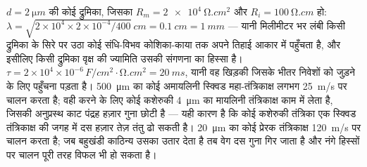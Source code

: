 \begin{example}[किसी द्रुमिका और दो तंत्रिकाक्षों के आँकड़े]\label{ex:b3:nervous-systems:numbers}
$d = \qty{2}{\micro m}$ की कोई द्रुमिका, जिसका $R_{m} = \qty{2e4}{\ohm.cm^2}$
और $R_{i} = \qty{100}{\ohm.cm}$ हो: $\lambda = \sqrt{2\times 10^{4}\times
2\times 10^{-4}/400}\ \unit{cm} = \qty{0.1}{cm} = \qty{1}{mm}$ --- यानी
मिलीमीटर भर लंबी किसी द्रुमिका के सिरे पर उठा कोई संधि-विभव कोशिका-काया
तक अपने तिहाई आकार में पहुँचता है, और इसीलिए किसी द्रुमिका वृक्ष की
ज्यामिति उसकी संगणना का हिस्सा है। $\tau = 2\times 10^{4}\times
10^{-6}\,\unit{F/cm^2}\cdot\unit{\ohm.cm^2} = \qty{20}{ms}$, यानी वह
खिड़की जिसके भीतर निवेशों को जुड़ने के लिए पहुँचना पड़ता है।
\qty{500}{\micro m} का कोई अमायलिनी स्क्विड महा-तंत्रिकाक्ष लगभग
\qty{25}{m/s} पर चालन करता है; वही करने के लिए कोई कशेरुकी
\qty{4}{\micro m} का मायलिनी तंत्रिकाक्ष काम में लेता है, जिसकी
अनुप्रस्थ काट पंद्रह हज़ार गुना छोटी है --- यही कारण है कि कोई कशेरुकी
तंत्रिका एक स्क्विड तंत्रिकाक्ष की जगह में दस हज़ार तेज़ तंतु ढो सकती
है। \qty{20}{\micro m} का कोई प्रेरक तंत्रिकाक्ष \qty{120}{m/s} पर
चालन करता है; जब बहुखंडी काठिन्य उसका  उतार देता है तब वेग दस
गुना गिर जाता है और नंगे हिस्सों पर चालन पूरी तरह विफल भी हो सकता है।
\end{example}

